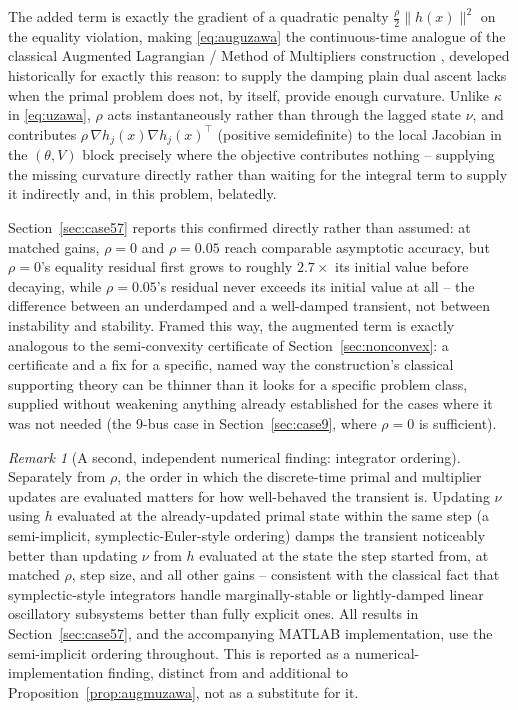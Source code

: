 \documentclass[11pt,onecolumn]{article}
\theoremstyle{definition}
\theoremstyle{remark}
\newtheorem{remark}[theorem]{Remark}
\begin{document}
The added term is exactly the gradient of a quadratic penalty $\frac{\rho}{2} \|h(x)\|^2$ on
the equality violation, making \eqref{eq:auguzawa} the continuous-time analogue of the
classical Augmented Lagrangian / Method of Multipliers construction \cite{hestenes1969,powell1969},
developed historically for exactly this reason: to supply the damping plain dual ascent lacks
when the primal problem does not, by itself, provide enough curvature. Unlike $\kappa$ in
\eqref{eq:uzawa}, $\rho$ acts instantaneously rather than through the lagged state $\nu$, and
contributes $\rho\, \nabla h_j(x) \nabla h_j(x)^\top$ (positive semidefinite) to the local
Jacobian in the $(\theta, V)$ block precisely where the objective contributes nothing --
supplying the missing curvature directly rather than waiting for the integral term to supply it
indirectly and, in this problem, belatedly.

Section~\ref{sec:case57} reports this confirmed directly rather than assumed: at matched gains,
$\rho = 0$ and $\rho = 0.05$ reach comparable asymptotic accuracy, but $\rho = 0$'s equality
residual first grows to roughly $2.7\times$ its initial value before decaying, while
$\rho = 0.05$'s residual never exceeds its initial value at all -- the difference between an
underdamped and a well-damped transient, not between instability and stability. Framed this
way, the augmented term is exactly analogous to the semi-convexity certificate of
Section~\ref{sec:nonconvex}: a certificate and a fix for a specific, named way the
construction's classical supporting theory can be thinner than it looks for a specific problem
class, supplied without weakening anything already established for the cases where it was not
needed (the 9-bus case in Section~\ref{sec:case9}, where $\rho = 0$ is sufficient).

\begin{remark}[A second, independent numerical finding: integrator ordering]
Separately from $\rho$, the order in which the discrete-time primal and multiplier updates are
evaluated matters for how well-behaved the transient is. Updating $\nu$ using $h$ evaluated at
the already-updated primal state within the same step (a semi-implicit, symplectic-Euler-style
ordering) damps the transient noticeably better than updating $\nu$ from $h$ evaluated at the
state the step started from, at matched $\rho$, step size, and all other gains -- consistent
with the classical fact that symplectic-style integrators handle marginally-stable or
lightly-damped linear oscillatory subsystems better than fully explicit ones. All results in
Section~\ref{sec:case57}, and the accompanying MATLAB implementation, use the semi-implicit
ordering throughout. This is reported as a numerical-implementation finding, distinct from and
additional to Proposition~\ref{prop:augmuzawa}, not as a substitute for it.
\end{remark}
\end{document}
